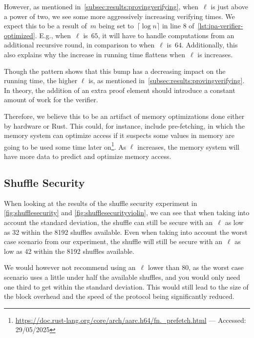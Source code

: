 However, as mentioned in~\autoref{subsec:results:provingverifying}, when~$\ell$ is just above a power of two, we see some more aggressively increasing verifying times.
We expect this to be a result of~$m$ being set to~$\lceil\log n\rceil$ in line 8 of~\autoref{lst:ipa-verifier-optimized}.
E.g., when~$\ell$ is~$65$, it will have to handle computations from an additional recursive round, in comparison to when~$\ell$ is~$64$.
Additionally, this also explains why the increase in running time flattens when~$\ell$ is increases.

Though the pattern shows that this bump has a decreasing impact on the running time, the higher $\ell$ is, as mentioned in~\autoref{subsec:results:provingverifying}.
In theory, the addition of an extra proof element should introduce a constant amount of work for the verifier.

Therefore, we believe this to be an artifact of memory optimizations done either by hardware or Rust.
This could, for instance, include pre-fetching, in which the memory system can optimize access if it suspects some values in memory are going to be used some time later on\footnote{\href{https://doc.rust-lang.org/core/arch/aarch64/fn._prefetch.html}{https://doc.rust-lang.org/core/arch/aarc.h64/fn.\_prefetch.html} — Accessed: 29/05/2025}.
As $\ell$ increases, the memory system will have more data to predict and optimize memory access.

\subsection{Shuffle Security}\label{subsec:Discution-Shuffle-security}
When looking at the results of the shuffle security experiment in \autoref{fig:shufflesecurity} and \autoref{fig:shufflesecurityviolin}, we can see that when taking into account the standard deviation, the shuffle can still be secure with an~$\ell$ as low as 32 within the 8192 shuffles available.
Even when taking into account the worst case scenario from our experiment, the shuffle will still be secure with an~$\ell$ as low as 42 within the 8192 shuffles available.

We would however not recommend using an~$\ell$ lower than 80, as the worst case scenario uses a little under half the available shuffles, and you would only need one third to get within the standard deviation.
This would still lead to the size of the block overhead and the speed of the protocol being significantly reduced.



